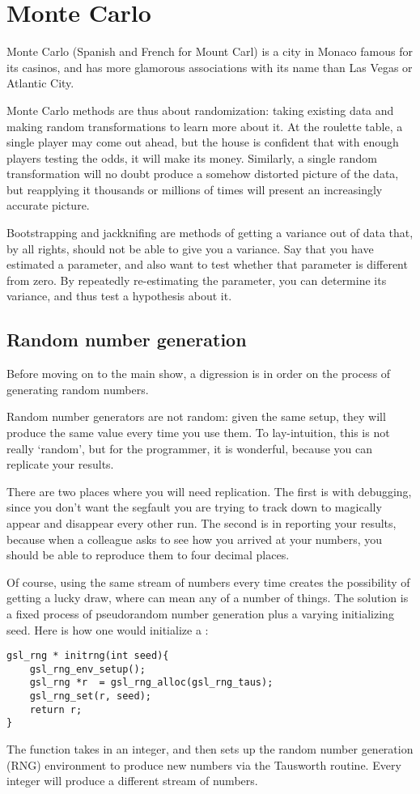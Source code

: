 \chapter{Monte Carlo} \label{boot}

Monte Carlo (Spanish and French for Mount Carl) is a city in Monaco
famous for its casinos, and has more glamorous associations with its name
than Las Vegas or Atlantic City.

Monte Carlo methods are thus about randomization: taking existing data
and making random transformations to learn more about it. At the
roulette table, a single player may come out ahead, but the house is
confident that with enough players testing the odds, it will make its
money.  Similarly, a single random transformation will no doubt produce a
somehow distorted picture of the data, but reapplying it thousands or
millions of times will present an increasingly accurate picture.

Bootstrapping and jackknifing are methods of getting a variance out of
data that, by all rights, should not be able to give you a variance. Say
that you have estimated a parameter, and also want to test whether
that parameter is different from zero. By repeatedly re-estimating the
parameter, you can determine its variance, and thus test a hypothesis
about it.

\section{Random number generation}\label{randomnumbers}
Before moving on to the main show, a digression is in order on the
process of generating random numbers. 

Random number generators are not random: given the same setup, they
will produce the same value every time you use them. To lay-intuition,
this is not really `random', but for the programmer, it is wonderful,
because you can replicate your results.

There are two places where you will need replication. The first is with
debugging, since you don't want the segfault you are trying to track
down to magically appear and disappear every other run. The second is
in reporting your results, because when a colleague asks to see how you
arrived at your numbers, you should be able to reproduce them to four
decimal places.

Of course, using the same stream of numbers every time creates the
possibility of getting a lucky draw, where  can mean any of a
number of things. The solution is a fixed process of pseudorandom
number generation plus a varying initializing seed. Here is how one
would initialize a :
\begin{lstlisting}
gsl_rng * initrng(int seed){
    gsl_rng_env_setup();
    gsl_rng *r  = gsl_rng_alloc(gsl_rng_taus);
    gsl_rng_set(r, seed);  
    return r;
}
\end{lstlisting}
The function takes in an integer, and then sets up the random number
generation (RNG) environment to produce new numbers via the Tausworth
routine. Every integer will produce a different stream of numbers.

